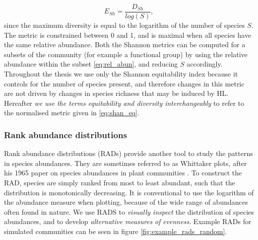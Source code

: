 \begin{equation}
E_{Sh} = \frac{D_{Sh}}{log(S)},
\label{eq:shan_eq}
\end{equation}
%
since the maximum diversity is equal to the logarithm of the number of species $S$. The metric is constrained between 0 and 1, and is maximal when all species have the same relative abundance. Both the Shannon metrics can be computed for a subsets of the community (for example a functional group) by using the relative abundance within the subset \eqref{eq:rel_abun}, and reducing $S$ accordingly. Throughout the thesis we use only the Shannon equitability index because it controls for the number of species present, and therefore changes in this metric are not driven by changes in species richness that may be induced by HL. Hereafter \emph{we use the terms equitability and diversity interchangeably} to refer to the normalised metric given in \eqref{eq:shan_eq}.  

\subsubsection{Rank abundance distributions}
\label{sec:define_rads}

Rank abundance distributions (RADs) provide another tool to study the patterns in species abundances. They are sometimes referred to as Whittaker plots, after his 1965 paper on species abundances in plant communities \cite{whittaker1965dominance}. To construct the RAD, species are simply ranked from most to least abundant, such that the distribution is monotonically decreasing. It is conventional to use the logarithm of the abundance measure when plotting, because of the wide range of abundances often found in nature. We use RADS to \emph{visually inspect} the distribution of species abundances, and to develop \emph{alternative measures of evenness}. Example RADs for simulated communities can be seen in figure \ref{fig:example_rads_random}.

